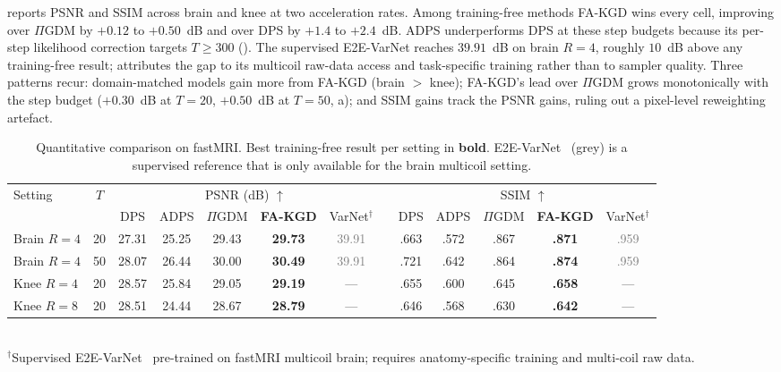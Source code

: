 \documentclass[conference]{IEEEtran}
\begin{document}
 reports PSNR and SSIM across brain and knee at two
acceleration rates. Among training-free methods FA-KGD wins every cell,
improving over $\Pi$GDM by $+0.12$ to $+0.50$~dB and over DPS by $+1.4$
to $+2.4$~dB. ADPS underperforms DPS at these step budgets because its
per-step likelihood correction targets $T\!\geq\!300$ ().
The supervised E2E-VarNet reaches $39.91$~dB on brain $R{=}4$, roughly
$10$~dB above any training-free result;  attributes the
gap to its multicoil raw-data access and task-specific training rather
than to sampler quality. Three patterns recur:
domain-matched models gain more from FA-KGD (brain $>$ knee); FA-KGD's
lead over $\Pi$GDM grows monotonically with the step budget
($+0.30$~dB at $T{=}20$, $+0.50$~dB at $T{=}50$, a);
and SSIM gains track the PSNR gains, ruling out a pixel-level
reweighting artefact.

\begin{table}[t]
\centering
\caption{Quantitative comparison on fastMRI. Best training-free result per setting in \textbf{bold}. E2E-VarNet~\cite{sriram2020varnet} (grey) is a supervised reference that is only available for the brain multicoil setting.}
\label{tab:results}
\small
\setlength{\tabcolsep}{6pt}
\begin{tabular}{@{}l c ccccc c ccccc@{}}
\toprule
\multirow{2}{*}{Setting} & \multirow{2}{*}{$T$}
  & \multicolumn{5}{c}{PSNR (dB) $\uparrow$} & \phantom{x}
  & \multicolumn{5}{c}{SSIM $\uparrow$} \\
\cmidrule{3-7} \cmidrule{9-13}
 & & DPS & ADPS & $\Pi$GDM & \textbf{FA-KGD} & VarNet$^\dagger$ &
 & DPS & ADPS & $\Pi$GDM & \textbf{FA-KGD} & VarNet$^\dagger$ \\
\midrule
Brain $R{=}4$ & 20 & 27.31 & 25.25 & 29.43 & \textbf{29.73} & \textcolor{gray}{39.91} & & .663 & .572 & .867 & \textbf{.871} & \textcolor{gray}{.959} \\
Brain $R{=}4$ & 50 & 28.07 & 26.44 & 30.00 & \textbf{30.49} & \textcolor{gray}{39.91} & & .721 & .642 & .864 & \textbf{.874} & \textcolor{gray}{.959} \\
Knee $R{=}4$  & 20 & 28.57 & 25.84 & 29.05 & \textbf{29.19} & ---                      & & .655 & .600 & .645 & \textbf{.658} & --- \\
Knee $R{=}8$  & 20 & 28.51 & 24.44 & 28.67 & \textbf{28.79} & ---                      & & .646 & .568 & .630 & \textbf{.642} & --- \\
\bottomrule
\end{tabular}
\vspace{2pt}
\\{\scriptsize $^\dagger$Supervised E2E-VarNet~\cite{sriram2020varnet} pre-trained on fastMRI multicoil brain; requires anatomy-specific training and multi-coil raw data.}
\end{table}
\end{document}
